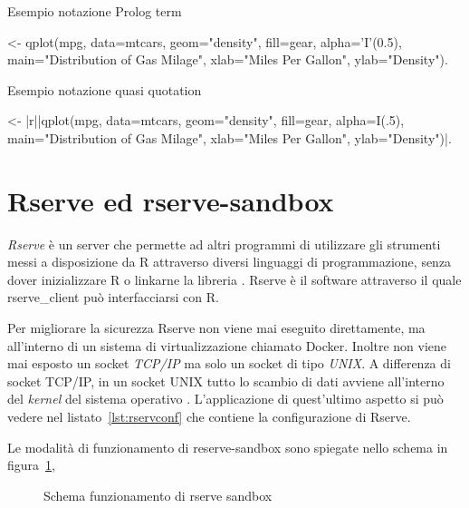 \documentclass[10pt,titlepage,twoside,a4paper]{report}
\newenvironment{code}{\singlespacing\captionsetup{type=listing}}{}
\begin{document}
\begin{code}
    \caption{Esempio notazione Prolog term}
    \label{lst:esempioPrologTerm}
    \begin{prologcode*}{}
<- qplot(mpg, data=mtcars, geom="density", fill=gear, alpha='I'(0.5), main="Distribution of Gas Milage", xlab="Miles Per Gallon", ylab="Density").
    \end{prologcode*}
\end{code}

\begin{code}
    \caption{Esempio notazione quasi quotation}
    \label{lst:esempioquasiQuotation}
    \begin{prologcode*}{}
<- {|r||qplot(mpg, data=mtcars, geom="density", fill=gear, alpha=I(.5), main="Distribution of Gas Milage", xlab="Miles Per Gallon", ylab="Density")|}.
    \end{prologcode*}
\end{code}


\section{Rserve ed rserve-sandbox}

\emph{Rserve} è un server che permette ad altri programmi di
utilizzare gli strumenti messi a disposizione da R attraverso diversi
linguaggi di programmazione, senza dover inizializzare R o
linkarne la libreria \cite{rserve}. Rserve è il software attraverso il quale 
rserve\_client può interfacciarsi con R.

Per migliorare la sicurezza Rserve non 
viene mai eseguito direttamente, ma all'interno di un sistema di 
virtualizzazione chiamato Docker. Inoltre non viene mai esposto un socket 
\emph{TCP/IP} ma solo un socket di tipo \emph{UNIX}. A differenza di socket 
TCP/IP, in un socket UNIX tutto lo scambio di dati avviene all'interno del 
\emph{kernel} del sistema operativo \cite{unixSocket}. 
L'applicazione di quest'ultimo aspetto si può vedere nel 
listato~\ref{lst:rservconf} che contiene la configurazione di Rserve.

Le modalità di funzionamento di reserve-sandbox sono spiegate nello schema in 
figura~\ref{fig:rserveSandboxScheme}, 

\begin{figure}[H]
\centering
\caption{Schema funzionamento di rserve sandbox}
\label{fig:rserveSandboxScheme}
\end{figure}
\end{document}
